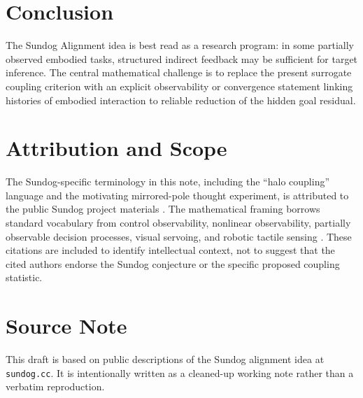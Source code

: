 \documentclass[11pt]{article}
\begin{document}
\section{Conclusion}

The Sundog Alignment idea is best read as a research program: in some partially observed embodied tasks, structured indirect feedback may be sufficient for target inference. The central mathematical challenge is to replace the present surrogate coupling criterion with an explicit observability or convergence statement linking histories of embodied interaction to reliable reduction of the hidden goal residual.

\section*{Attribution and Scope}

The Sundog-specific terminology in this note, including the ``halo coupling'' language and the motivating mirrored-pole thought experiment, is attributed to the public Sundog project materials \cite{sundogSite}. The mathematical framing borrows standard vocabulary from control observability, nonlinear observability, partially observable decision processes, visual servoing, and robotic tactile sensing \cite{kalman1960,hermann1977,kaelbling1998,chaumette2006,dahiya2010}. These citations are included to identify intellectual context, not to suggest that the cited authors endorse the Sundog conjecture or the specific proposed coupling statistic.

\section*{Source Note}

This draft is based on public descriptions of the Sundog alignment idea at \texttt{sundog.cc}. It is intentionally written as a cleaned-up working note rather than a verbatim reproduction.
\end{document}
